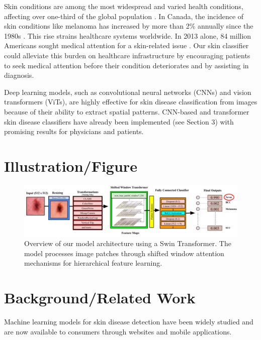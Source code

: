 \documentclass{article} %
\begin{document}
Skin conditions are among the most widespread and varied health conditions, affecting over one-third of the global population \citep{li2024epidemiological}. In Canada, the incidence of skin conditions like melanoma has increased by more than 2\% annually since the 1980s \citep{canadian_dermatology_association}. This rise strains healthcare systems worldwide. In 2013 alone, 84 million Americans sought medical attention for a skin-related issue \citep{american_academy_dermatology}. Our skin classifier could alleviate this burden on healthcare infrastructure by encouraging patients to seek medical attention before their condition deteriorates and by assisting in diagnosis.

Deep learning models, such as convolutional neural networks (CNNs) and vision transformers (ViTs), are highly effective for skin disease classification from images because of their ability to extract spatial patterns. CNN-based and transformer skin disease classifiers have already been implemented (see Section 3) with promising results for physicians and patients.

\section{Illustration/Figure}

\begin{figure}[H]
\begin{center}
\includegraphics[width=1\textwidth]{Figs/swin_architecture.png}
\end{center}
\caption{Overview of our model architecture using a Swin Transformer. The model processes image patches through shifted window attention mechanisms for hierarchical feature learning.}
\label{fig:swin_architecture}
\end{figure}

\section{Background/Related Work}

Machine learning models for skin disease detection have been widely studied and are now available to consumers through websites and mobile applications.
\end{document}
